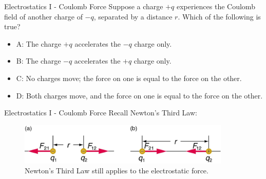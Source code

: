 \documentclass{beamer}
\begin{document}
\begin{frame}{Electrostatics I - Coulomb Force}
Suppose a charge $+q$ experiences the Coulomb field of another charge of $-q$, separated by a distance $r$.  Which of the following is true?
\begin{itemize}
\item A: The charge $+q$ accelerates the $-q$ charge only.
\item B: The charge $-q$ accelerates the $+q$ charge only.
\item C: No charges move; the force on one is equal to the force on the other.
\item D: Both charges move, and the force on one is equal to the force on the other.
\end{itemize}
\end{frame}

\begin{frame}{Electrostatics I - Coulomb Force}
Recall Newton's Third Law:
\begin{figure}
\centering
\includegraphics[width=0.9\textwidth]{figures/third.png}
\caption{\label{fig:third} Newton's Third Law still applies to the electrostatic force.}
\end{figure}
\end{frame}
\end{document}
